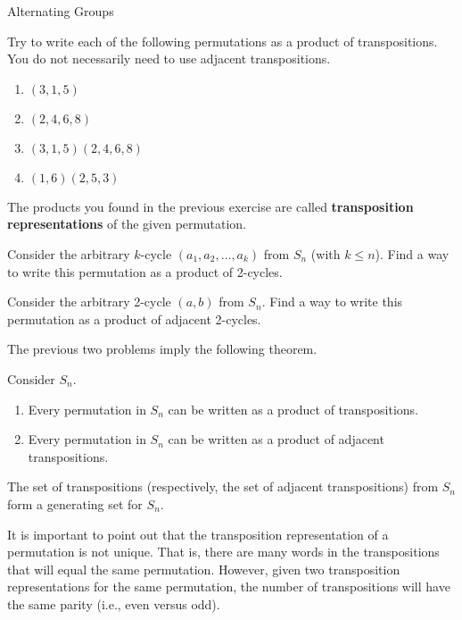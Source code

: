 \begin{section}{Alternating Groups}
\begin{exercise}
Try to write each of the following permutations as a product of transpositions.  You do not necessarily need to use adjacent transpositions.
\begin{enumerate}
\item $(3,1,5)$
\item $(2,4,6,8)$
\item $(3,1,5)(2,4,6,8)$
\item $(1,6)(2,5,3)$
\end{enumerate}
\end{exercise}

The products you found in the previous exercise are called \textbf{transposition representations} of the given permutation.

\begin{problem}
Consider the arbitrary $k$-cycle $(a_1,a_2,\ldots, a_k)$ from $S_n$ (with $k\leq n$).  Find a way to write this permutation as a product of 2-cycles. 
\end{problem}

\begin{problem}
Consider the arbitrary 2-cycle $(a,b)$ from $S_n$.  Find a way to write this permutation as a product of adjacent 2-cycles.
\end{problem}

The previous two problems imply the following theorem.

\begin{theorem}
Consider $S_n$.
\begin{enumerate}
\item Every permutation in $S_n$ can be written as a product of transpositions.
\item Every permutation in $S_n$ can be written as a product of adjacent transpositions.
\end{enumerate}
\end{theorem}

\begin{corollary}
The set of transpositions (respectively, the set of adjacent transpositions) from $S_n$ form a generating set for $S_n$.
\end{corollary}

It is important to point out that the transposition representation of a permutation is not unique.  That is, there are many words in the transpositions that will equal the same permutation.  However, given two transposition representations for the same permutation, the number of transpositions will have the same parity (i.e., even versus odd).


\end{section}
